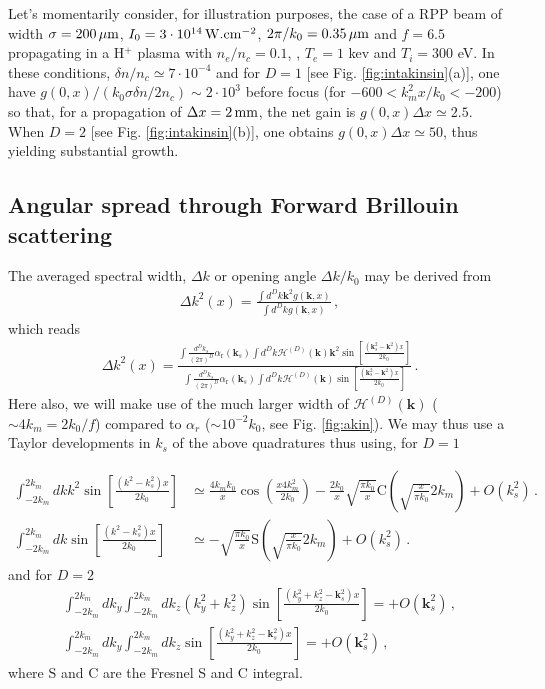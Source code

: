 \documentclass[
 reprint,
 amsmath,amssymb,
 aps,
]{revtex4-1}
\begin{document}
Let's momentarily consider, for illustration purposes,  the  case of a RPP beam of width $\sigma =200\,\rm\mu m$, $I_0=3\cdot 10^{14} \,\rm W.cm^{-2}$, $2\pi/k_0 = 0.35\,\rm\mu m$ and $f = 6.5$ propagating in a H$^{+}$ plasma with $n_e/n_c=0.1$, , $T_e=1$ kev and $T_i=300$ eV. In these conditions, $\delta n/n_c \simeq 7\cdot 10^{-4}$ and  for $D=1$ [see Fig. \ref{fig:intakinsin}(a)], one have $g(0,x)/(k_0\sigma \delta n /2n_c) \sim 2\cdot 10^3$ before focus (for $-600< k_m^2 x/k_0 < -200$) so that, for  a propagation of $\Delta x = 2\,\rm mm$, the net gain is $g(0,x)\Delta x\simeq 2.5 $. When $D=2$ [see Fig. \ref{fig:intakinsin}(b)], one obtains $g(0,x)\Delta x\simeq 50 $, thus yielding substantial growth.

\subsection{Angular spread through Forward Brillouin scattering}
The averaged spectral width, $\Delta k$ or opening angle $\Delta k/k_0 $ may be derived from  
 \begin{align}
 \Delta k ^2(x) = \frac{\int  d^Dk \mathbf{k}^2 g(\mathbf{k},x )}{\int  d^Dk  g(\mathbf{k},x )}\, ,
\end{align}
which reads 
 \begin{align}
 \Delta k ^2(x) = \frac{
  \int \frac{d^Dk_s}{(2\pi)^D}  \alpha_\mathrm{r}(\mathbf{k}_s) 
 \int  d^Dk \mathcal{H}^{(D)}(\mathbf{k})\mathbf{k}^2 \sin\left[ \frac{(\mathbf{k}_s^2-\mathbf{k}^2)x}{2k_0}\right]
 }{
  \int \frac{d^Dk_s}{(2\pi)^D}  \alpha_\mathrm{r}(\mathbf{k}_s) 
\int  d^Dk\mathcal{H}^{(D)}(\mathbf{k})\sin\left[ \frac{(\mathbf{k}_s^2-\mathbf{k}^2)x}{2k_0}\right]
 }\, .
\end{align}
Here also, we will make use of the much larger width of $\mathcal{H}^{(D)}(\mathbf{k})$ ($\sim 4k_m = 2k_0/f$) compared to $\alpha_r$ ($\sim 10^{-2}k_0$, see Fig. \ref{fig:akin}).
We may thus use a Taylor developments in $k_s$ of the above quadratures thus using, for $D=1$

 \begin{widetext}
\begin{align}
 \int_{-2k_m}^{2k_m}  dk  k^2 \sin\left[ \frac{ (k^2-k_s^2)x}{2k_0}\right] &\simeq \frac{4k_mk_0}{x}\cos\left(\frac{x 4k_m^2}{2k_0}\right) - \frac{2k_0}{x} \sqrt{\frac{\pi k_0}{x}} \mathrm{C}\left( \sqrt{\frac{x}{\pi k_0}}  2k_m \right)
 + O(k_s^2)\, . \\ 
 \int_{-2k_m}^{2k_m}  dk  \sin\left[ \frac{ (k^2-k_s^2)x}{2k_0}\right] &\simeq 
 -\sqrt{\frac{\pi k_0}{x}} \mathrm{S}\left( \sqrt{\frac{x}{\pi k_0}}  2k_m \right)
  + O(k_s^2)\, . 
\end{align}
and for $D=2$
\begin{align}
 \int_{-2k_m}^{2k_m}  dk_y  \int_{-2k_m}^{2k_m}  dk_z  (k_y^2+k_z^2) \sin\left[ \frac{(k_y^2+k_z^2 -\mathbf{k}_s^2) x}{2k_0}\right] =  
 + O(\mathbf{k}_s^2)\, , \\
 \int_{-2k_m}^{2k_m}  dk_y  \int_{-2k_m}^{2k_m}  dk_z  \sin\left[ \frac{(k_y^2+k_z^2 -\mathbf{k}_s^2) x}{2k_0}\right] = 
  + O(\mathbf{k}_s^2)\, ,
\end{align}
 where $\mathrm{S}$ and $\mathrm{C}$ are the Fresnel S and C integral. 
 
 \end{widetext}
\end{document}
